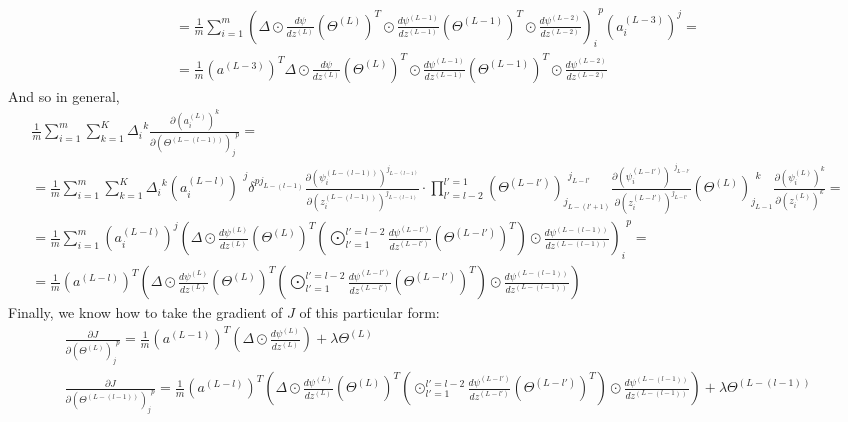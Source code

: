 \documentclass[10pt]{amsart}
\begin{document}
\begin{multicols*}{2}
\[\begin{gathered}
= \frac{1}{m} \sum_{i=1}^m \left( \Delta \odot \frac{d\psi}{dz^{(L)}} (\Theta^{(L)})^T \odot \frac{d\psi^{(L-1)} }{ dz^{(L-1)}} (\Theta^{(L-1)} )^T \odot \frac{d\psi^{(L-2)} }{ dz^{(L-2)}} \right)_i^{\  \  p} (a_i^{(L-3)} )^j = \\
= \frac{1}{m} (a^{(L-3)})^T \Delta \odot \frac{d\psi }{dz^{(L)}} (\Theta^{(L)})^T \odot \frac{d\psi^{(L-1)} }{ dz^{(L-1)}} (\Theta^{(L-1)})^T \odot \frac{d\psi^{(L-2)} }{dz^{(L-2)}}
\end{gathered}\]
And so in general, 
\begin{equation}
\begin{gathered}
\frac{1}{m} \sum_{i=1}^m \sum_{k=1}^K \Delta_i^{\  \  k} \frac{\partial (a_i^{(L)})^k }{ \partial (\Theta^{(L-(l-1))})_j^{\  \  p} } =  \\
= \frac{1}{m} \sum_{i=1}^m \sum_{k=1}^K \Delta_i^{\  \  k}  (a_i^{(L-l)})^{\  \  j} \delta^{pj_{L-(l-1)} }   \frac{ \partial (\psi_i^{(L-(l-1))})^{j_{L-(l-1)} } }{ \partial (z_i^{(L-(l-1))})^{j_{L-(l-1)} } } 	\cdot \prod_{l' = l-2}^{l'=1} (\Theta^{(L-l')})_{ j_{L-(l'+1)}}^{\  \  j_{L-l'}}      \frac{ \partial (\psi_i^{(L-l')})^{\  \  j_{L-l'} } }{ \partial (z_i^{(L-l')})^{ j_{L-l'}} } (\Theta^{(L)})_{ j_{L-1}}^{\  \  k}      \frac{ \partial (\psi_i^{(L)})^{ k } }{ \partial (z_i^{(L)})^{  k} } = \\
= \frac{1}{m} \sum_{i=1}^m (a_i^{(L-l)})^j \left( \Delta \odot \frac{d\psi^{(L)} }{ dz^{(L)}} (\Theta^{(L)})^T \left( \bigodot_{l'=1}^{l'=l-2} \frac{d\psi^{(L-l')} }{ dz^{(L-l')}} (\Theta^{(L-l')})^T \right) \odot \frac{d\psi^{ (L-(l-1))} }{ dz^{(L-(l-1))}} \right)_i^{\  \  p} = \\
=\boxed{ \frac{1}{m} (a^{(L-l)})^T  \left( \Delta \odot \frac{d\psi^{(L)} }{ dz^{(L)}} (\Theta^{(L)})^T \left( \bigodot_{l'=1}^{l'=l-2} \frac{d\psi^{(L-l')} }{ dz^{(L-l')}} (\Theta^{(L-l')})^T \right) \odot \frac{d\psi^{ (L-(l-1))} }{ dz^{(L-(l-1))}} \right)  
}
\end{gathered}
\end{equation}
Finally, we know how to take the gradient of $J$ of this particular form:  
\begin{equation}\label{Eq:DNN_gradJ_L2norm_Thetas}
\boxed{\begin{gathered}
	\frac{ \partial J }{ \partial (\Theta^{(L)})_j^{\  \  p} } = \frac{1}{m} (a^{(L-1)})^T \left( \Delta \odot \frac{d\psi^{(L)} }{ dz^{(L)} } \right) + \lambda \Theta^{(L)}	\\
	\frac{ \partial J }{ \partial (\Theta^{(L-(l-1))})_j^{\  \  p} } = \frac{1}{m} (a^{(L-l)})^T \left( \Delta \odot \frac{d\psi^{(L)}}{dz^{(L)} } (\Theta^{(L)})^T \left( \odot_{l'=1}^{l'=l-2} \frac{d\psi^{(L-l')}}{dz^{(L-l') } } (\Theta^{(L-l')})^T \right) \odot \frac{d\psi^{(L-(l-1)) } }{ dz^{(L-(l-1)) } } \right) + \lambda \Theta^{(L-(l-1)) } \\

\end{gathered}}
\end{equation}
\end{multicols*}
\end{document}
